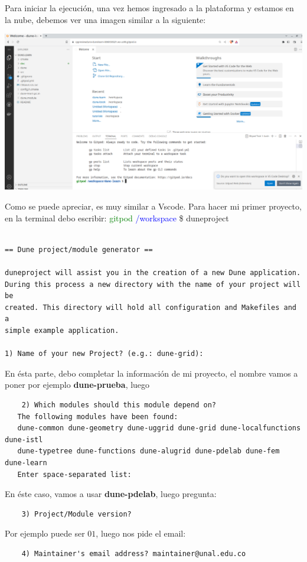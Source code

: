 Para iniciar la ejecución, una vez hemos ingresado a la plataforma y estamos en la nube, debemos ver una imagen similar 
a la siguiente:
\begin{center}\label{fig:ingreso}
	\includegraphics[scale=0.3]{PantallaIngreso.png}
\end{center}
Como se puede apreciar, es muy similar a Vscode.  Para hacer mi primer proyecto, en la terminal debo escribir:
\textcolor{green}{gitpod} \textcolor{blue}{/workspace} \$ duneproject 
\begin{verbatim}

== Dune project/module generator ==

duneproject will assist you in the creation of a new Dune application.
During this process a new directory with the name of your project will be
created. This directory will hold all configuration and Makefiles and a
simple example application.

1) Name of your new Project? (e.g.: dune-grid): 
\end{verbatim}
En ésta parte, debo completar la información de mi proyecto, el nombre vamos a poner por ejemplo \textbf{dune-prueba}, luego
\begin{verbatim}
	2) Which modules should this module depend on?
   The following modules have been found:
   dune-common dune-geometry dune-uggrid dune-grid dune-localfunctions dune-istl 
   dune-typetree dune-functions dune-alugrid dune-pdelab dune-fem dune-learn 
   Enter space-separated list:
\end{verbatim}
En éste caso, vamos a usar \textbf{dune-pdelab}, luego pregunta:
\begin{verbatim}
	3) Project/Module version? 
\end{verbatim}
Por ejemplo puede ser $01$, luego nos pide el email:
\begin{verbatim}
	4) Maintainer's email address? maintainer@unal.edu.co 
\end{verbatim}
